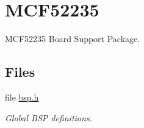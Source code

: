 \hypertarget{group__RTEMSBSPsM68kMCF52235}{}\section{M\+C\+F52235}
\label{group__RTEMSBSPsM68kMCF52235}


M\+C\+F52235 Board Support Package.  


\subsection*{Files}
\begin{DoxyCompactItemize}
\item 
file \mbox{\hyperlink{bsps_2m68k_2mcf52235_2include_2bsp_8h}{bsp.\+h}}
\begin{DoxyCompactList}\small\item\em Global B\+SP definitions. \end{DoxyCompactList}\end{DoxyCompactItemize}
